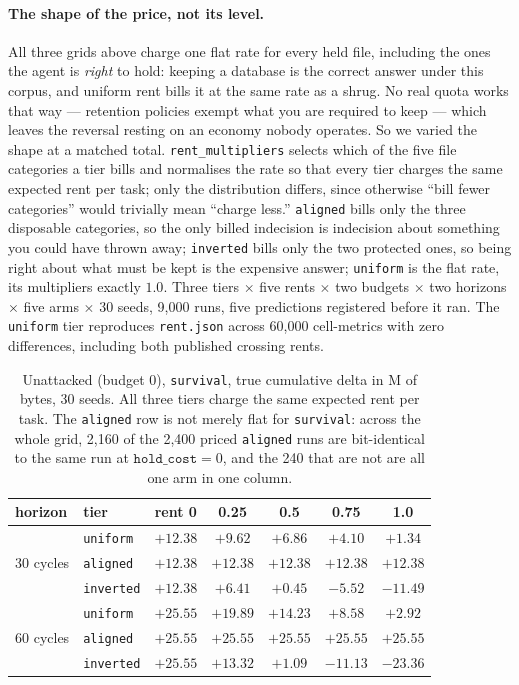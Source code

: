 \paragraph{The shape of the price, not its level.} All three grids
above charge one flat rate for every held file, including the ones the
agent is \emph{right} to hold: keeping a database is the correct answer
under this corpus, and uniform rent bills it at the same rate as a
shrug. No real quota works that way --- retention policies exempt what
you are required to keep --- which leaves the reversal resting on an
economy nobody operates. So we varied the shape at a matched total.
\texttt{rent\_multipliers} selects which of the five file categories a
tier bills and normalises the rate so that every tier charges the same
expected rent per task; only the distribution differs, since otherwise
``bill fewer categories'' would trivially mean ``charge less.''
\texttt{aligned} bills only the three disposable categories, so the only
billed indecision is indecision about something you could have thrown
away; \texttt{inverted} bills only the two protected ones, so being
right about what must be kept is the expensive answer; \texttt{uniform}
is the flat rate, its multipliers exactly $1.0$. Three tiers $\times$
five rents $\times$ two budgets $\times$ two horizons $\times$ five arms
$\times$ 30 seeds, 9,000 runs, five predictions registered before it
ran. The \texttt{uniform} tier reproduces \texttt{rent.json} across
60,000 cell-metrics with zero differences, including both published
crossing rents.

\begin{table}[t]
\centering
\tabsize
\caption{Unattacked (budget 0), \texttt{survival}, true cumulative delta
in M of bytes, 30 seeds. All three tiers charge the same expected rent
per task. The \texttt{aligned} row is not merely flat for
\texttt{survival}: across the whole grid, 2,160 of the 2,400 priced
\texttt{aligned} runs are bit-identical to the same run at
$\texttt{hold\_cost}=0$, and the 240 that are not are all one arm in one
column.}
\label{tab:rent-tiers}
\begin{tabular}{llccccc}
\toprule
horizon & tier & rent 0 & 0.25 & 0.5 & 0.75 & 1.0 \\
\midrule
\multirow{3}{*}{30 cycles}
 & \texttt{uniform}           & $+12.38$ & $+9.62$ & $+6.86$ & $+4.10$ & $+1.34$ \\
 & \texttt{aligned}          & $\mathbf{+12.38}$ & $\mathbf{+12.38}$ & $\mathbf{+12.38}$ & $\mathbf{+12.38}$ & $\mathbf{+12.38}$ \\
 & \texttt{inverted}          & $+12.38$ & $+6.41$ & $+0.45$ & $-5.52$ & $-11.49$ \\
\midrule
\multirow{3}{*}{60 cycles}
 & \texttt{uniform}           & $+25.55$ & $+19.89$ & $+14.23$ & $+8.58$ & $+2.92$ \\
 & \texttt{aligned}          & $\mathbf{+25.55}$ & $\mathbf{+25.55}$ & $\mathbf{+25.55}$ & $\mathbf{+25.55}$ & $\mathbf{+25.55}$ \\
 & \texttt{inverted}          & $+25.55$ & $+13.32$ & $+1.09$ & $-11.13$ & $-23.36$ \\
\bottomrule
\end{tabular}
\end{table}

